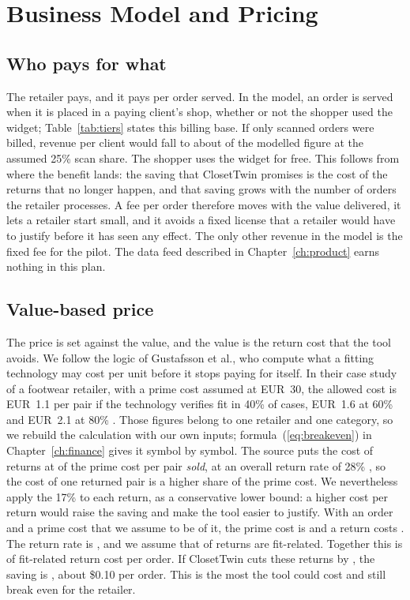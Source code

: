 \chapter{Business Model and Pricing}\label{ch:business}

\section{Who pays for what}\label{sec:pay}

The retailer pays, and it pays per order served. In the model, an order is served when it is placed in a paying client's shop, whether or not the shopper used the widget; Table~\ref{tab:tiers} states this billing base. If only scanned orders were billed, revenue per client would fall to about  of the modelled figure at the assumed 25\% scan share. The shopper uses the widget for free. This follows from where the benefit lands: the saving that ClosetTwin promises is the cost of the returns that no longer happen, and that saving grows with the number of orders the retailer processes. A fee per order therefore moves with the value delivered, it lets a retailer start small, and it avoids a fixed license that a retailer would have to justify before it has seen any effect. The only other revenue in the model is the fixed fee for the pilot. The data feed described in Chapter~\ref{ch:product} earns nothing in this plan.

\section{Value-based price}\label{sec:pricing-value}

The price is set against the value, and the value is the return cost that the tool avoids. We follow the logic of Gustafsson et al., who compute what a fitting technology may cost per unit before it stops paying for itself. In their case study of a footwear retailer, with a prime cost assumed at EUR~30, the allowed cost is EUR~1.1 per pair if the technology verifies fit in 40\% of cases, EUR~1.6 at 60\% and EUR~2.1 at 80\% \cite{gustafsson2021}. Those figures belong to one retailer and one category, so we rebuild the calculation with our own inputs; formula~(\ref{eq:breakeven}) in Chapter~\ref{ch:finance} gives it symbol by symbol. The source puts the cost of returns at  of the prime cost per pair \emph{sold}, at an overall return rate of 28\% \cite{gustafsson2021}, so the cost of one returned pair is a higher share of the prime cost. We nevertheless apply the 17\% to each return, as a conservative lower bound: a higher cost per return would raise the saving and make the tool easier to justify. With an  order and a prime cost that we assume to be  of it, the prime cost is  and a return costs . The return rate is  \cite{coresight2023}, and we assume that  of returns are fit-related. Together this is  of fit-related return cost per order. If ClosetTwin cuts these returns by , the saving is , about \$0.10 per order. This is the most the tool could cost and still break even for the retailer.

